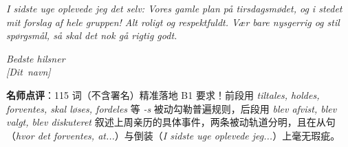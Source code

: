 \begin{answerbox}
\textit{I sidste uge oplevede jeg det selv: Vores gamle plan  på tirsdagsmødet, og i stedet  mit forslag  af hele gruppen! Alt  roligt og respektfuldt. Vær bare nysgerrig og stil spørgsmål, så skal det nok gå rigtig godt.}

\textit{Bedste hilsner\\
\mbox{[Dit navn]}}

\small\textbf{名师点评}：115 词（不含署名）精准落地 B1 要求！前段用 \textit{tiltales, holdes, forventes, skal løses, fordeles} 等 \textit{-s} 被动勾勒普遍规则，后段用 \textit{blev afvist, blev valgt, blev diskuteret} 叙述上周亲历的具体事件，两条被动轨道分明，且在从句（\textit{hvor det forventes, at...}）与倒装（\textit{I sidste uge oplevede jeg...}）上毫无瑕疵。
\end{answerbox}

